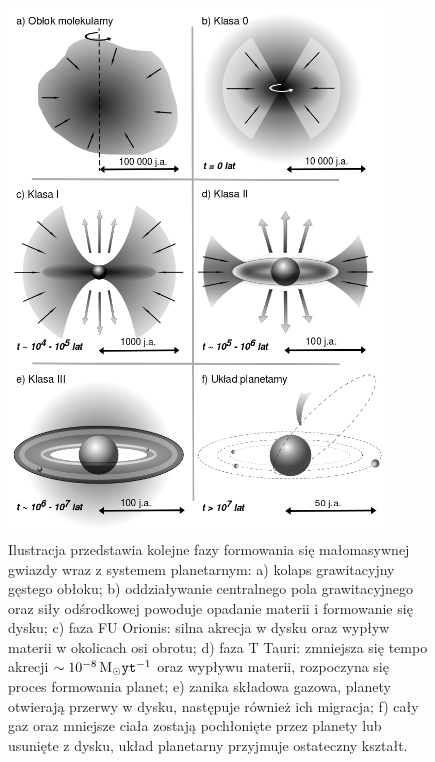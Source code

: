 \begin{figure}[p]
\centering 
\includegraphics[width=0.9\textwidth]{figures/planetformation.png}
\caption{Ilustracja przedstawia kolejne fazy formowania się małomasywnej gwiazdy
   wraz z systemem planetarnym: a) kolaps grawitacyjny gęstego obłoku; b)
   oddziaływanie centralnego pola grawitacyjnego oraz siły odśrodkowej powoduje
   opadanie materii i formowanie się dysku; c) faza FU Orionis: silna akrecja w
   dysku oraz wypływ materii w okolicach osi obrotu; d) faza T Tauri: zmniejsza
   się tempo akrecji $\sim 10^{-8}\hbox{$\mathrm{\thinspace M_{\odot}}$}{\texttt{yt}}^{-1}$ oraz wypływu materii,
   rozpoczyna się proces formowania planet; e) zanika składowa gazowa, planety
otwierają przerwy w dysku, następuje również ich migracja; f) cały gaz oraz
mniejsze ciała zostają pochłonięte przez planety lub usunięte z dysku, układ
planetarny przyjmuje ostateczny kształt.}

\label{fig:planet}
\end{figure}


